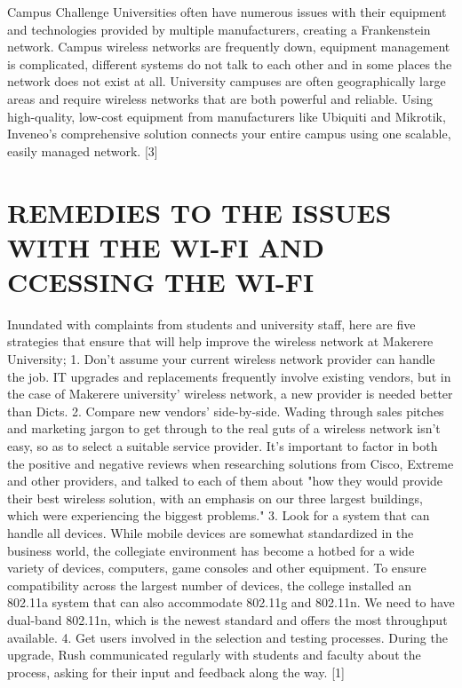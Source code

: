 ﻿\documentclass[10]{article}
\begin{document}
Campus Challenge
Universities often have numerous issues with their equipment and technologies provided by multiple manufacturers, creating a Frankenstein network. Campus wireless networks are frequently down, equipment management is complicated, different systems do not talk to each other and in some places the network does not exist at all. University campuses are often geographically large areas and require wireless networks that are both powerful and reliable.
Using high-quality, low-cost equipment from manufacturers like Ubiquiti and Mikrotik, Inveneo’s comprehensive solution connects your entire campus using one scalable, easily managed network. [3]



\section{REMEDIES TO THE ISSUES WITH THE WI-FI AND CCESSING THE WI-FI}
Inundated with complaints from students and university staff, here are five strategies that ensure that will help improve the wireless network at Makerere University;
1. Don't assume your current wireless network provider can handle the job. IT upgrades and replacements frequently involve existing vendors, but in the case of Makerere university’ wireless network, a new provider is needed better than Dicts.
2. Compare new vendors’ side-by-side. Wading through sales pitches and marketing jargon to get through to the real guts of a wireless network isn't easy, so as to select a suitable service provider. It’s important to factor in both the positive and negative reviews when researching solutions from Cisco, Extreme and other providers, and talked to each of them about "how they would provide their best wireless solution, with an emphasis on our three largest buildings, which were experiencing the biggest problems."
3. Look for a system that can handle all devices. While mobile devices are somewhat standardized in the business world, the collegiate environment has become a hotbed for a wide variety of devices, computers, game consoles and other equipment.
To ensure compatibility across the largest number of devices, the college installed an 802.11a system that can also accommodate 802.11g and 802.11n. We need to have dual-band 802.11n, which is the newest standard and offers the most throughput available. 
4. Get users involved in the selection and testing processes. During the upgrade, Rush communicated regularly with students and faculty about the process, asking for their input and feedback along the way. [1]
\end{document}
